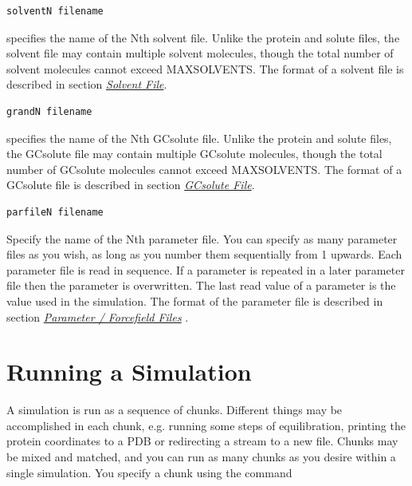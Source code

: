 \documentclass[letterpaper,10pt,english]{sphinxmanual}
\begin{document}
\begin{Verbatim}[commandchars=\\\{\}]
solventN filename
\end{Verbatim}

specifies the name of the Nth solvent file. Unlike the protein and solute files, the solvent file may contain multiple solvent molecules, though the total number of solvent molecules cannot exceed MAXSOLVENTS. The format of a solvent file is described in section {\hyperref[protoms:solventpdb]{\emph{Solvent File}}}.

\begin{Verbatim}[commandchars=\\\{\}]
grandN filename
\end{Verbatim}

specifies the name of the Nth GCsolute file. Unlike the protein and solute files, the GCsolute file may contain multiple GCsolute molecules, though the total number of GCsolute molecules cannot exceed MAXSOLVENTS. The format of a GCsolute file is described in section {\hyperref[protoms:gcpdb]{\emph{GCsolute File}}}.

\begin{Verbatim}[commandchars=\\\{\}]
parfileN filename
\end{Verbatim}

Specify the name of the Nth parameter file. You can specify as many parameter files as you wish, as long as you number them sequentially from 1 upwards. Each parameter file is read in sequence. If a parameter is repeated in a later parameter file then the parameter is overwritten. The last read value of a parameter is the value used in the simulation. The format of the parameter file is described in section {\hyperref[protoms:parfil]{\emph{Parameter / Forcefield Files}}} .


\section{Running a Simulation}
\label{protoms:running-a-simulation}\label{protoms:runcmd}
A simulation is run as a sequence of chunks. Different things may be accomplished in each chunk, e.g. running some steps of equilibration, printing the protein coordinates to a PDB or redirecting a stream to a new file. Chunks may be mixed and matched, and you can run as many chunks as you desire within a single simulation. You specify a chunk using the command
\end{document}
